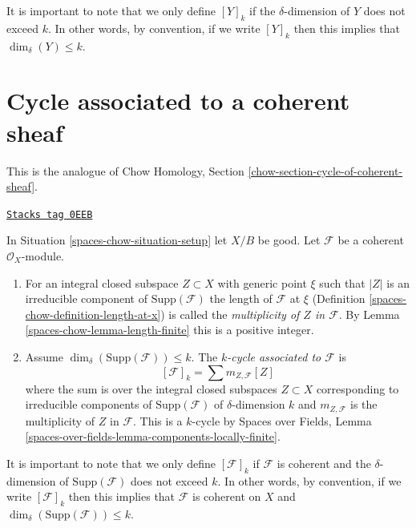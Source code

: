It is important to note that we only define $[Y]_k$ if the $\delta$-dimension
of $Y$ does not exceed $k$. In other words, by convention, if we write
$[Y]_k$ then this implies that $\dim_\delta(Y) \leq k$.

\section{Cycle associated to a coherent sheaf}
\label{spaces-chow-section-cycle-of-coherent-sheaf}
This is the analogue of
Chow Homology, Section \ref{chow-section-cycle-of-coherent-sheaf}.

\begin{definition}
\label{spaces-chow-definition-cycle-associated-to-coherent-sheaf}
\href{https://stacks.math.columbia.edu/tag/0EEB}{\texttt{Stacks tag 0EEB}}

In Situation \ref{spaces-chow-situation-setup} let $X/B$ be good.
Let $\mathcal{F}$ be a coherent $\mathcal{O}_X$-module.
\begin{enumerate}
\item For an integral closed subspace $Z \subset X$ with generic point $\xi$
such that $|Z|$ is an irreducible component of $\text{Supp}(\mathcal{F})$
the length of $\mathcal{F}$ at $\xi$ (Definition \ref{spaces-chow-definition-length-at-x})
is called the {\it multiplicity of $Z$ in $\mathcal{F}$}.
By Lemma \ref{spaces-chow-lemma-length-finite} this is a positive integer.
\item Assume $\dim_\delta(\text{Supp}(\mathcal{F})) \leq k$.
The {\it $k$-cycle associated to $\mathcal{F}$} is
$$
[\mathcal{F}]_k = \sum m_{Z, \mathcal{F}}[Z]
$$
where the sum is over the integral closed subspaces $Z \subset X$
corresponding to irreducible components of
$\text{Supp}(\mathcal{F})$ of $\delta$-dimension $k$
and $m_{Z, \mathcal{F}}$ is the multiplicity of $Z$ in $\mathcal{F}$.
This is a $k$-cycle by Spaces over Fields, Lemma
\ref{spaces-over-fields-lemma-components-locally-finite}.
\end{enumerate}
\end{definition}

It is important to note that we only define $[\mathcal{F}]_k$
if $\mathcal{F}$ is coherent and the $\delta$-dimension
of $\text{Supp}(\mathcal{F})$ does not exceed $k$. In other words,
by convention, if we write $[\mathcal{F}]_k$ then this implies that
$\mathcal{F}$ is coherent on $X$ and
$\dim_\delta(\text{Supp}(\mathcal{F})) \leq k$.

